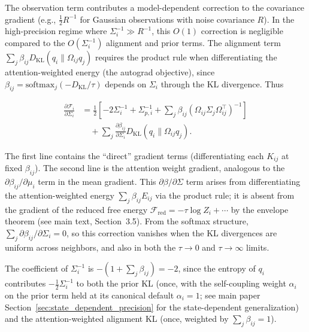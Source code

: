\documentclass[twoside,11pt]{article}
\begin{document}
The observation term contributes a model-dependent correction to the covariance gradient (e.g., $\frac{1}{2}R^{-1}$ for Gaussian observations with noise covariance $R$). In the high-precision regime where $\Sigma_i^{-1} \gg R^{-1}$, this $O(1)$ correction is negligible compared to the $O(\Sigma_i^{-1})$ alignment and prior terms. The alignment term $\sum_j \beta_{ij} D_{\mathrm{KL}}(q_i \| \Omega_{ij} q_j)$ requires the product rule when differentiating the attention-weighted energy (the autograd objective), since $\beta_{ij} = \mathrm{softmax}_j(-D_{\mathrm{KL}}/\tau)$ depends on $\Sigma_i$ through the KL divergence. Thus

\begin{equation}
\boxed{
\begin{aligned}
\frac{\partial \mathcal{F}_i}{\partial \Sigma_i}
&=\frac{1}{2}
\left[
-2 \Sigma_i^{-1}
+ \Sigma_{p,i}^{-1}
+ \sum_j \beta_{ij}
(\Omega_{ij}\Sigma_j\Omega_{ij}^\top)^{-1}
\right] \\
&\quad + \sum_j \frac{\partial \beta_{ij}}{\partial \Sigma_i}
D_{\mathrm{KL}}(q_i \| \Omega_{ij} q_j).
\end{aligned}
}
\label{eq:Sigma_gradient_final}
\end{equation}

The first line contains the ``direct'' gradient terms (differentiating each $K_{ij}$ at fixed $\beta_{ij}$). The second line is the attention weight gradient, analogous to the $\partial \beta_{ij}/\partial \mu_i$ term in the mean gradient. This $\partial\beta/\partial\Sigma$ term arises from differentiating the attention-weighted energy $\sum_j \beta_{ij} E_{ij}$ via the product rule; it is absent from the gradient of the reduced free energy $\mathcal{F}_{\mathrm{red}} = -\tau\log Z_i + \cdots$ by the envelope theorem (see main text, Section~3.5). From the softmax structure, $\sum_j \partial \beta_{ij}/\partial \Sigma_i = 0$, so this correction vanishes when the KL divergences are uniform across neighbors, and also in both the $\tau \to 0$ and $\tau \to \infty$ limits.

The coefficient of $\Sigma_i^{-1}$ is $-(1 + \sum_j \beta_{ij}) = -2$, since the entropy of $q_i$ contributes $-\frac{1}{2}\Sigma_i^{-1}$ to both the prior KL (once, with the self-coupling weight $\alpha_i$ on the prior term held at its canonical default $\alpha_i = 1$; see main paper Section~\ref{sec:state_dependent_precision} for the state-dependent generalization) and the attention-weighted alignment KL (once, weighted by $\sum_j \beta_{ij} = 1$).
\end{document}
